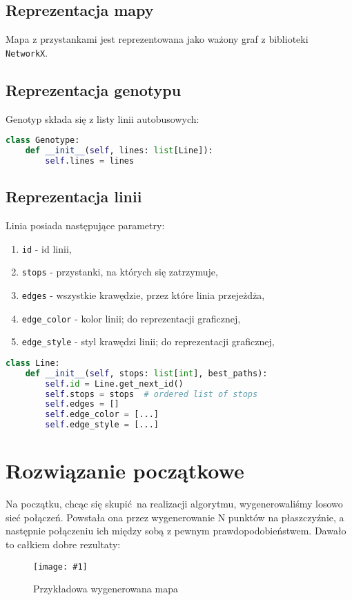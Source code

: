 \documentclass[12pt,a4paper,openright]{mwrep}
\newcommand{\imgcustomsize}[3]{
	\begin{figure}[H]
		\centering
		\texttt{[image: \#1]}
		\caption{#2}
	\end{figure}
}
\newcommand{\img}[2]{\imgcustomsize{#1}{#2}{0.8}}
\begin{document}
\subsection{Reprezentacja mapy}
Mapa z przystankami jest reprezentowana jako ważony graf z biblioteki \lstinline{NetworkX}.

\subsection{Reprezentacja genotypu}
Genotyp składa się z listy linii autobusowych:
\begin{lstlisting}[language=Python]
class Genotype:
    def __init__(self, lines: list[Line]):
        self.lines = lines
\end{lstlisting}

\subsection{Reprezentacja linii}
Linia posiada następujące parametry:
\begin{enumerate}
    \item \lstinline{id} - id linii,
    \item \lstinline{stops} - przystanki, na których się zatrzymuje,
    \item \lstinline{edges} - wszystkie krawędzie, przez które linia przejeżdża,
    \item \lstinline{edge_color} - kolor linii; do reprezentacji graficznej,
    \item \lstinline{edge_style} - styl krawędzi linii; do reprezentacji graficznej,
\end{enumerate}


\begin{lstlisting}[language=Python]
class Line:
    def __init__(self, stops: list[int], best_paths):
        self.id = Line.get_next_id()
        self.stops = stops  # ordered list of stops
        self.edges = []
        self.edge_color = [...]
        self.edge_style = [...]
\end{lstlisting}

\section{Rozwiązanie początkowe}
Na początku, chcąc się skupić na realizacji algorytmu, wygenerowaliśmy losowo sieć połączeń. Powstała ona przez wygenerowanie N punktów na płaszczyźnie, a następnie połączeniu ich między sobą z pewnym prawdopodobieństwem. Dawało to całkiem dobre rezultaty:
\img{map_seed_46}{Przykładowa wygenerowana mapa}
\end{document}
